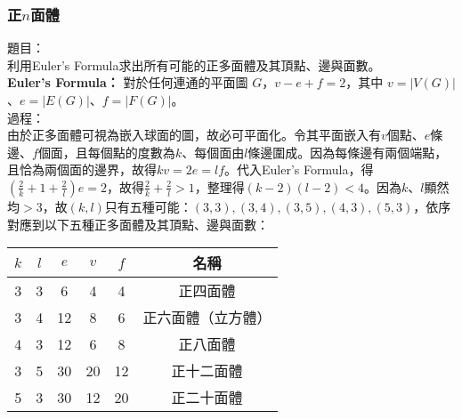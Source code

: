 \documentclass[a4paper,12pt]{report}
\begin{document}
\subsubsection{正$n$面體}
題目：\\
利用Euler's Formula求出所有可能的正多面體及其頂點、邊與面數。\\
\textbf{Euler's Formula：} 對於任何連通的平面圖 \(G\)，\(v - e + f = 2\)，其中 \(v=|V(G)|\)、\(e=|E(G)|\)、\(f=|F(G)|\)。\\
過程：\\
由於正多面體可視為嵌入球面的圖，故必可平面化。令其平面嵌入有$v$個點、$e$條邊、$f$個面，且每個點的度數為$k$、每個面由$l$條邊圍成。因為每條邊有兩個端點，且恰為兩個面的邊界，故得$kv=2e=lf$。代入Euler's Formula，得$\left(\frac{2}{k}+1+\frac{2}{l}\right)e=2$，故得$\frac{2}{k}+\frac{2}{l}>1$，整理得$(k-2)(l-2)<4$。因為$k$、$l$顯然均$>3$，故$(k, l)$只有五種可能：$(3,3),(3,4),(3,5),(4,3),(5,3)$，依序對應到以下五種正多面體及其頂點、邊與面數： \\
\begin{table}[h]
\centering
\begin{tabular}{|c|c|c|c|c|c|}
\hline
$k$ & $l$ & $e$ & $v$ & $f$ & 名稱 \\
\hline
3 & 3 & 6 & 4 & 4 & 正四面體 \\
\hline
3 & 4 & 12 & 8 & 6 & 正六面體（立方體） \\
\hline
4 & 3 & 12 & 6 & 8 & 正八面體 \\
\hline
3 & 5 & 30 & 20 & 12 & 正十二面體 \\
\hline
5 & 3 & 30 & 12 & 20 & 正二十面體 \\
\hline
\end{tabular}
\end{table}
\end{document}
